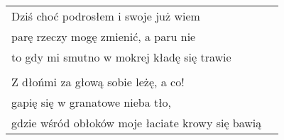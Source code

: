 \documentclass[a5paper]{article}
\begin{document}
\noindent
\begin{tabular}{@{}p{10.50cm}p{3cm}@{}}
Dziś choć podrosłem i swoje już wiem \\
parę rzeczy mogę zmienić, a paru nie \\
to gdy mi smutno w mokrej kładę się trawie \\ \\

Z dłońmi za głową sobie leżę, a co! \\
gapię się w granatowe nieba tło, \\
gdzie wśród obłoków moje łaciate krowy się bawią
\end{tabular}
\end{document}
